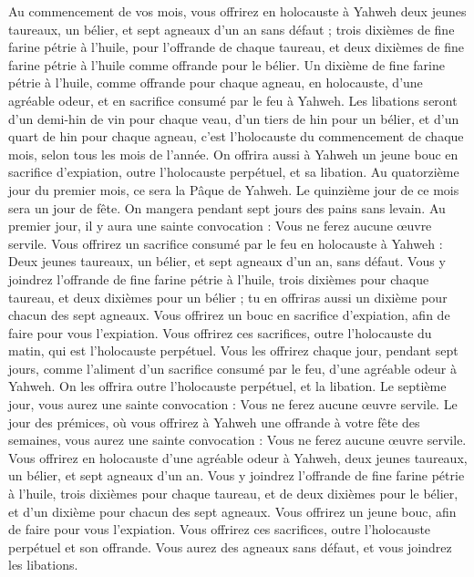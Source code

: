 \begin{multicols}{2}
Au commencement de vos mois, vous offrirez en holocauste à Yahweh deux jeunes taureaux, un bélier, et sept agneaux d'un an sans défaut ;
trois dixièmes de fine farine pétrie à l'huile, pour l’offrande de chaque taureau, et deux dixièmes de fine farine pétrie à l'huile comme offrande pour le bélier.
Un dixième de fine farine pétrie à l'huile, comme offrande pour chaque agneau, en holocauste, d’une agréable odeur, et en sacrifice consumé par le feu à Yahweh.
Les libations seront d'un demi-hin de vin pour chaque veau, d’un tiers de hin pour un bélier, et d’un quart de hin pour chaque agneau, c'est l'holocauste du commencement de chaque mois, selon tous les mois de l'année.
On offrira aussi à Yahweh un jeune bouc en sacrifice d’expiation, outre l'holocauste perpétuel, et sa libation.
Au quatorzième jour du premier mois, ce sera la Pâque de Yahweh.
Le quinzième jour de ce mois sera un jour de fête. On mangera pendant sept jours des pains sans levain.
Au premier jour, il y aura une sainte convocation : Vous ne ferez aucune œuvre servile.
Vous offrirez un sacrifice consumé par le feu en holocauste à Yahweh : Deux jeunes taureaux, un bélier, et sept agneaux d'un an, sans défaut.
Vous y joindrez l’offrande de fine farine pétrie à l'huile, trois dixièmes pour chaque taureau, et deux dixièmes pour un bélier ;
tu en offriras aussi un dixième pour chacun des sept agneaux.
Vous offrirez un bouc en sacrifice d’expiation, afin de faire pour vous l’expiation.
Vous offrirez ces sacrifices, outre l'holocauste du matin, qui est l'holocauste perpétuel.
Vous les offrirez chaque jour, pendant sept jours, comme l’aliment d’un sacrifice consumé par le feu, d’une agréable odeur à Yahweh. On les offrira outre l'holocauste perpétuel, et la libation.
Le septième jour, vous aurez une sainte convocation : Vous ne ferez aucune œuvre servile.
Le jour des prémices, où vous offrirez à Yahweh une offrande à votre fête des semaines, vous aurez une sainte convocation : Vous ne ferez aucune œuvre servile.
Vous offrirez en holocauste d’une agréable odeur à Yahweh, deux jeunes taureaux, un bélier, et sept agneaux d'un an.
Vous y joindrez l’offrande de fine farine pétrie à l'huile, trois dixièmes pour chaque taureau, et de deux dixièmes pour le bélier,
et d'un dixième pour chacun des sept agneaux.
Vous offrirez un jeune bouc, afin de faire pour vous l’expiation.
Vous offrirez ces sacrifices, outre l'holocauste perpétuel et son offrande. Vous aurez des agneaux sans défaut, et vous joindrez les libations.

\end{multicols}
